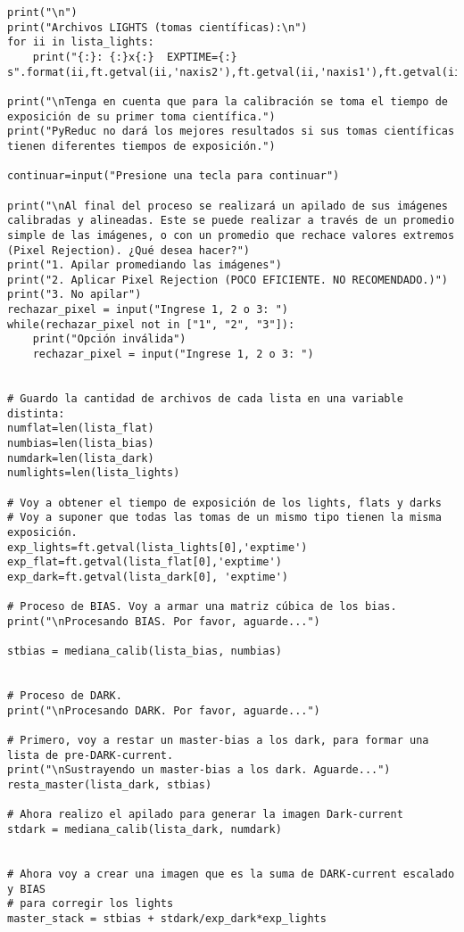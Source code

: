 \begin{lstlisting}[style=python]
print("\n")
print("Archivos LIGHTS (tomas científicas):\n")
for ii in lista_lights:
    print("{:}: {:}x{:}  EXPTIME={:} s".format(ii,ft.getval(ii,'naxis2'),ft.getval(ii,'naxis1'),ft.getval(ii,'exptime')))

print("\nTenga en cuenta que para la calibración se toma el tiempo de exposición de su primer toma científica.")
print("PyReduc no dará los mejores resultados si sus tomas científicas tienen diferentes tiempos de exposición.")

continuar=input("Presione una tecla para continuar")

print("\nAl final del proceso se realizará un apilado de sus imágenes calibradas y alineadas. Este se puede realizar a través de un promedio simple de las imágenes, o con un promedio que rechace valores extremos (Pixel Rejection). ¿Qué desea hacer?")
print("1. Apilar promediando las imágenes")
print("2. Aplicar Pixel Rejection (POCO EFICIENTE. NO RECOMENDADO.)")
print("3. No apilar")
rechazar_pixel = input("Ingrese 1, 2 o 3: ")
while(rechazar_pixel not in ["1", "2", "3"]):
    print("Opción inválida")
    rechazar_pixel = input("Ingrese 1, 2 o 3: ")
    

# Guardo la cantidad de archivos de cada lista en una variable distinta:
numflat=len(lista_flat)
numbias=len(lista_bias)
numdark=len(lista_dark)
numlights=len(lista_lights)

# Voy a obtener el tiempo de exposición de los lights, flats y darks
# Voy a suponer que todas las tomas de un mismo tipo tienen la misma exposición.
exp_lights=ft.getval(lista_lights[0],'exptime')
exp_flat=ft.getval(lista_flat[0],'exptime')
exp_dark=ft.getval(lista_dark[0], 'exptime')

# Proceso de BIAS. Voy a armar una matriz cúbica de los bias.
print("\nProcesando BIAS. Por favor, aguarde...")

stbias = mediana_calib(lista_bias, numbias)


# Proceso de DARK.
print("\nProcesando DARK. Por favor, aguarde...")

# Primero, voy a restar un master-bias a los dark, para formar una lista de pre-DARK-current.
print("\nSustrayendo un master-bias a los dark. Aguarde...")
resta_master(lista_dark, stbias)

# Ahora realizo el apilado para generar la imagen Dark-current
stdark = mediana_calib(lista_dark, numdark)


# Ahora voy a crear una imagen que es la suma de DARK-current escalado y BIAS
# para corregir los lights
master_stack = stbias + stdark/exp_dark*exp_lights


\end{lstlisting}
